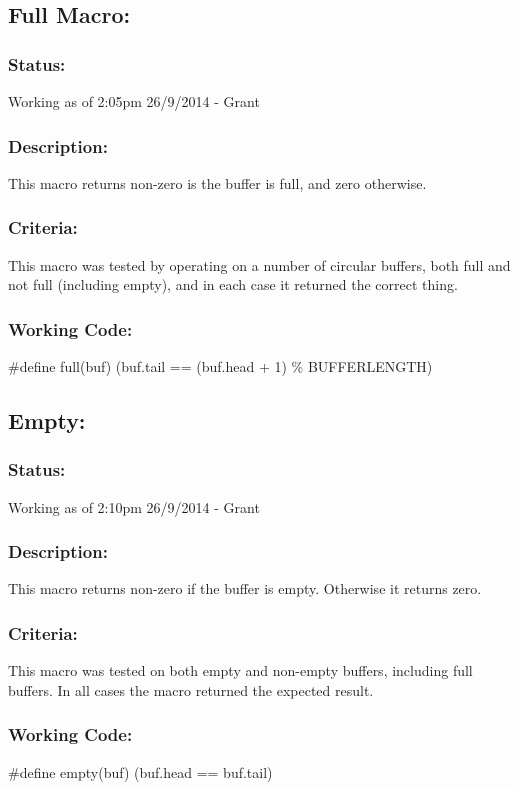 \documentclass[]{article}
\begin{document}
\subsection{Full Macro:}
\subsubsection{Status:}
Working as of 2:05pm 26/9/2014 - Grant

\subsubsection{Description:}
This macro returns non-zero is the buffer is full, and zero otherwise.

\subsubsection{Criteria:}
This macro was tested by operating on a number of circular buffers, both full and not full (including empty), and in each case it returned the correct thing.

\subsubsection{Working Code:}
\#define full(buf) (buf.tail == (buf.head + 1) \% BUFFERLENGTH)

\subsection{Empty:}
\subsubsection{Status:}
Working as of 2:10pm 26/9/2014 - Grant

\subsubsection{Description:}
This macro returns non-zero if the buffer is empty. Otherwise it returns zero.

\subsubsection{Criteria:}
This macro was tested on both empty and non-empty buffers, including full buffers. In all cases the macro returned the expected result.

\subsubsection{Working Code:}
\#define empty(buf) (buf.head == buf.tail)
\end{document}
